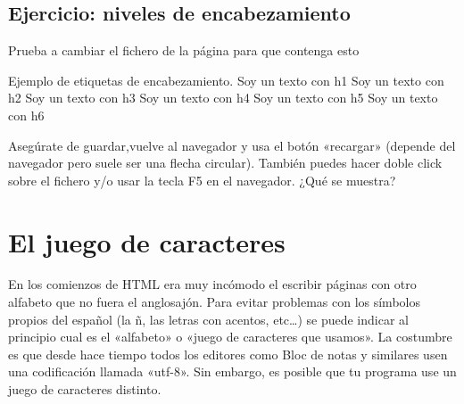 \documentclass[a4paper,12pt,spanish]{sphinxmanual}
\begin{document}
\section{Ejercicio: niveles de encabezamiento}
\label{\detokenize{index:ejercicio-niveles-de-encabezamiento}}
Prueba a cambiar el fichero de la página para que contenga esto

%
\begin{sphinxVerbatim}[commandchars=\\\{\}]
      
         Ejemplo de etiquetas de encabezamiento.
     Soy un texto con h1
     Soy un texto con h2
     Soy un texto con h3
     Soy un texto con h4
     Soy un texto con h5
     Soy un texto con h6
\end{sphinxVerbatim}

Asegúrate de guardar,vuelve al navegador y usa el botón «recargar» (depende del navegador pero suele ser una flecha circular). También puedes hacer doble click sobre el fichero y/o usar la tecla F5 en el navegador. ¿Qué se muestra?


\chapter{El juego de caracteres}
\label{\detokenize{index:el-juego-de-caracteres}}
En los comienzos de HTML era muy incómodo el escribir páginas con otro alfabeto que no fuera el anglosajón. Para evitar problemas con los símbolos propios del español (la ñ, las letras con acentos, etc…) se puede indicar al principio cual es el «alfabeto» o «juego de caracteres que usamos». La costumbre es que desde hace tiempo todos los editores como Bloc de notas y similares usen una codificación llamada «utf-8». Sin embargo, es posible que tu programa use un juego de caracteres distinto.
\end{document}
